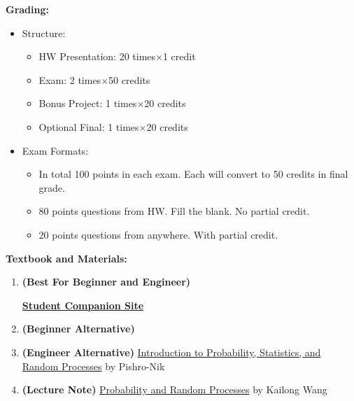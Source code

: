 \documentclass{article}
\begin{document}
\textbf{Grading:} {
    \begin{itemize}
        \item Structure: {
            \begin{itemize}
                \item HW Presentation: 20 times$\times$1 credit
                \item Exam: 2 times$\times$50 credits
                \item Bonus Project: 1 times$\times$20 credits
                \item Optional Final: 1 times$\times$20 credits
            \end{itemize}
        }
        \item Exam Formats: {
            \begin{itemize}
                \item In total 100 points in each exam. Each will convert to 50 credits in final grade.
                \item 80 points questions from HW. Fill the blank. No partial credit.
                \item 20 points questions from anywhere. With partial credit.
            \end{itemize}
        }
    \end{itemize}
}

\textbf{Textbook and Materials:} {
    \begin{enumerate}
        \item \textbf{(Best For Beginner and Engineer)} \label{book:Yates_Goodman_2015}

        \href{https://bcs.wiley.com/he-bcs/Books?action=index&itemId=1118324560&bcsId=8677}{\textbf{Student Companion Site}}
        \item \textbf{(Beginner Alternative)} 
        \item \textbf{(Engineer Alternative)} \href{https://www.probabilitycourse.com/}{Introduction to Probability, Statistics, and Random Processes} by Pishro-Nik
        \item \textbf{(Lecture Note)} \href{https://github.com/kwang0913/MyLatex/blob/main/2023ECE226Note/main.pdf}{Probability and Random Processes} by Kailong Wang
    \end{enumerate}
}
\end{document}
